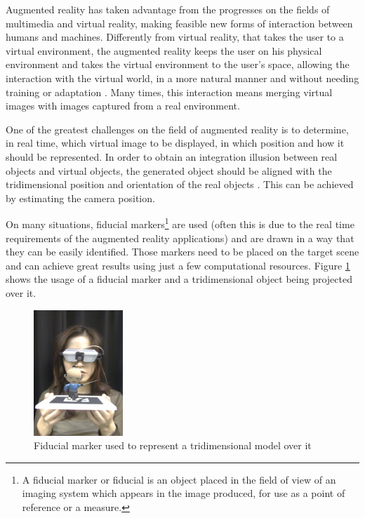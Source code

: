 \documentclass[msc, a4paper, classic, en]{ufbathesis}
\begin{document}
Augmented reality has taken advantage from the progresses on the fields of multimedia and virtual reality, making feasible new forms of
interaction between humans and machines. Differently from virtual reality, that takes the user to a virtual environment, the augmented
reality keeps the user on his physical environment and takes the virtual environment to the user's space, allowing the interaction with
the virtual world, in a more natural manner and without needing training or adaptation \cite{1}. Many times, this interaction means
merging virtual images with images captured from a real environment.

One of the greatest challenges on the field of augmented reality is to determine, in real time, which virtual image to be displayed,
in which position and how it should be represented. In order to obtain an integration illusion between real objects and virtual objects,
the generated object should be aligned with the tridimensional position and orientation of the real objects \cite{2}. This can be achieved
by estimating the camera position.

On many situations, fiducial markers\footnote{A fiducial marker or fiducial is an object placed in the field of view of an imaging system which appears in the image produced, for use as a point of reference or a measure.} are used (often this is due to the real time requirements of the augmented reality applications) \cite{3} and are drawn in a way that they can be easily identified. Those markers need to be placed on the target scene and can achieve great results using just a few computational resources. Figure \ref{fig:fiducial_marker} shows the usage of a fiducial marker and a tridimensional object being projected over it.

\begin{figure}
\label{fig:fiducial_marker}
\centering
\includegraphics[width=0.3\textwidth]{images/fiducial_marker.png}
\caption{Fiducial marker used to represent a tridimensional model over it \cite{35}}
\end{figure}
\end{document}
